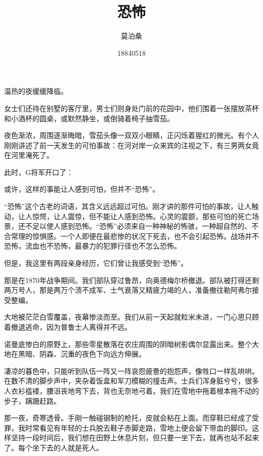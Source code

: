\documentclass{article}
\title{恐怖}
\author{莫泊桑}
\date{18840518}
\begin{document}



\Large

温热的夜缓缓降临。



女士们还待在别墅的客厅里，男士们则身处门前的花园中，他们围着一张摆放茶杯和小酒杯的圆桌，或默然静坐，或倒骑着椅子抽雪茄。



夜色渐浓，周围逐渐晦暗，雪茄头像一双双小眼睛，正闪烁着猩红的微光。有个人刚刚讲述了前一天发生的可怕事故：在河对岸一众来宾的注视之下，有三男两女竟在河里淹死了。



此时，G将军开口了：



或许，这样的事能让人感到可怕，但并不“恐怖”。



“恐怖”这个古老的词语，其含义远远超过可怕。刚才讲的那件可怕的事故，让人触动，让人惊愕，让人震惊，但不能让人感到恐怖。心灵的震颤，那些可怕的死亡场景，还不足以使人感到恐怖。“恐怖”必须来自一种神秘的怖骇，一种超自然的、不合常理的惊惧感。一个人即便在最悲惨的状况下死去，也不会引起恐怖。战场并不恐怖，流血也不恐怖，最暴力的犯罪行径也不怎么恐怖。



但是，我这里有两段亲身经历，它们曾让我感受到“恐怖”。



那是在1870年战争期间。我们部队穿过鲁昂，向奥德梅尔桥撤退。部队被打得还剩两万号人，那是两万个溃不成军、士气衰落又精疲力竭的人，准备撤往勒阿弗尔接受整编。



大地被茫茫白雪覆盖，夜幕惨淡而至。我们从前一天起就粒米未进，一门心思只顾着撤退逃命，因为普鲁士人离得并不远。



诺曼底惨白的原野上，那些零星散落在农庄周围的阴暗树影偶尔显露出来。整个大地在黑暗、阴森、沉重的夜色下向远方伸展。



凄凉的暮色中，只能听到队伍一阵又一阵哀怨疲惫的抱怨声，像牲口一样乱哄哄。在数不清的脚步声中，夹杂着饭盒和军刀模糊的撞击声。士兵们浑身脏兮兮，很多人衣衫褴褛，腰沮丧地弯下去，背也无奈地弓着。我们在雪地中拖着根本拖不动的步子，蹒跚赶路。



那一夜，奇寒透骨。手刚一触碰钢制的枪托，皮就会粘在上面。而穿鞋已经成了受罪，我时常看见有年轻的士兵脱去鞋子赤脚走路，雪地上便会留下带血的脚印。这样坚持一段时间后，我们想在田野上休息片刻，但只要一坐下去，就再也站不起来了。每个坐下去的人就是死人。
\end{document}
